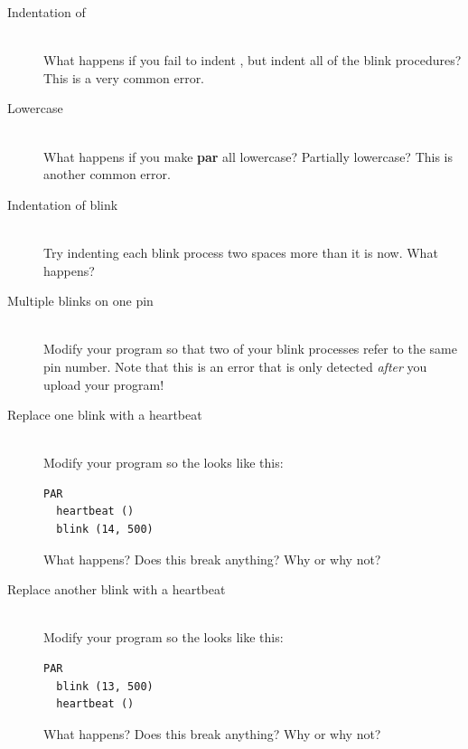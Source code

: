 \begin{description}
		\item[Indentation of \PAR]\ \\
	What happens if you fail to indent \PAR, but indent all of the {\procname blink} procedures? This is a very common error.
		\item[Lowercase \PAR]\ \\
	What happens if you make {\bfseries par} all lowercase? Partially lowercase? This is another common error.
	\item[Indentation of {\procname blink}]\ \\
	Try indenting each {\procname blink} process two spaces more than it is now. What happens?
	\item[Multiple {\procname blink}s on one pin]\ \\
	Modify your program so that two of your {\procname blink} processes refer to the same pin number. Note that this is an error that is only detected {\em after} you upload your program!
	\item[Replace one {\procname blink} with a {\procname heartbeat}]\ \\
	Modify your program so the \PAR looks like this:
	\begin{lstlisting}[firstnumber=2]
PAR
  heartbeat ()
  blink (14, 500)
	\end{lstlisting}
	What happens? Does this break anything? Why or why not?
	\item[Replace another {\procname blink} with a {\procname heartbeat}]\ \\
	Modify your program so the \PAR looks like this:
	\begin{lstlisting}[firstnumber=2]
PAR
  blink (13, 500)
  heartbeat ()
	\end{lstlisting}
	What happens? Does this break anything? Why or why not?
\end{description}
	
